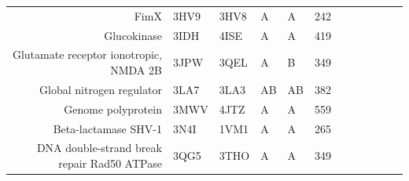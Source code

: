 \begin{table}
\begin{scriptsize}
\begin{tabular}{ r p{0.8cm} p{0.8cm} p{0.8cm} p{0.8cm} r r r r r r r }
\multicolumn{1}{r}{FimX} & \multicolumn{1}{l}{3HV9} & \multicolumn{1}{l}{3HV8} & \multicolumn{1}{l}{A} & \multicolumn{1}{l}{A} & 242   & \cellcolor[rgb]{ .573,  .816,  .314}  & \cellcolor[rgb]{ .573,  .816,  .314}  & \cellcolor[rgb]{ .573,  .816,  .314}  & \cellcolor[rgb]{ .573,  .816,  .314}  & \cellcolor[rgb]{ .573,  .816,  .314}  & \cellcolor[rgb]{ .573,  .816,  .314}  \\
\multicolumn{1}{r}{Glucokinase} & \multicolumn{1}{l}{3IDH} & \multicolumn{1}{l}{4ISE} & \multicolumn{1}{l}{A} & \multicolumn{1}{l}{A} & 419   & \cellcolor[rgb]{ 1,  .494,  .475}  & \cellcolor[rgb]{ 1,  .494,  .475}  & \cellcolor[rgb]{ 1,  .494,  .475}  & \cellcolor[rgb]{ .573,  .816,  .314}  & \cellcolor[rgb]{ .573,  .816,  .314}  & \cellcolor[rgb]{ .573,  .816,  .314}  \\
\multicolumn{1}{r}{Glutamate receptor ionotropic, NMDA 2B} & \multicolumn{1}{l}{3JPW} & \multicolumn{1}{l}{3QEL} & \multicolumn{1}{l}{A} & \multicolumn{1}{l}{B} & 349   & \cellcolor[rgb]{ 1,  .494,  .475}  & \cellcolor[rgb]{ 1,  .494,  .475}  & \cellcolor[rgb]{ 1,  .494,  .475}  & \cellcolor[rgb]{ 1,  .494,  .475}  & \cellcolor[rgb]{ 1,  .494,  .475}  & \cellcolor[rgb]{ 1,  .494,  .475}  \\
\multicolumn{1}{r}{Global nitrogen regulator} & \multicolumn{1}{l}{3LA7} & \multicolumn{1}{l}{3LA3} & \multicolumn{1}{l}{AB} & \multicolumn{1}{l}{AB} & 382   & \cellcolor[rgb]{ 1,  .494,  .475}  & \cellcolor[rgb]{ 1,  .494,  .475}  & \cellcolor[rgb]{ .573,  .816,  .314}  & \cellcolor[rgb]{ 1,  .494,  .475}  & \cellcolor[rgb]{ 1,  .494,  .475}  & \cellcolor[rgb]{ 1,  .494,  .475}  \\
\multicolumn{1}{r}{Genome polyprotein} & \multicolumn{1}{l}{3MWV} & \multicolumn{1}{l}{4JTZ} & \multicolumn{1}{l}{A} & \multicolumn{1}{l}{A} & 559   & \cellcolor[rgb]{ 1,  .494,  .475}  & \cellcolor[rgb]{ 1,  .494,  .475}  & \cellcolor[rgb]{ 1,  .494,  .475}  & \cellcolor[rgb]{ 1,  .494,  .475}  & \cellcolor[rgb]{ 1,  .494,  .475}  & \cellcolor[rgb]{ 1,  .494,  .475}  \\
\multicolumn{1}{r}{Beta-lactamase SHV-1} & \multicolumn{1}{l}{3N4I} & \multicolumn{1}{l}{1VM1} & \multicolumn{1}{l}{A} & \multicolumn{1}{l}{A} & 265   & \cellcolor[rgb]{ .573,  .816,  .314}  & \cellcolor[rgb]{ .573,  .816,  .314}  & \cellcolor[rgb]{ 1,  .494,  .475}  & \cellcolor[rgb]{ .573,  .816,  .314}  & \cellcolor[rgb]{ .573,  .816,  .314}  & \cellcolor[rgb]{ .573,  .816,  .314}  \\
\multicolumn{1}{r}{DNA double-strand break repair Rad50 ATPase} & \multicolumn{1}{l}{3QG5} & \multicolumn{1}{l}{3THO} & \multicolumn{1}{l}{A} & \multicolumn{1}{l}{A} & 349   & \cellcolor[rgb]{ 1,  .494,  .475}  & \cellcolor[rgb]{ 1,  .494,  .475}  & \cellcolor[rgb]{ 1,  .494,  .475}  & \cellcolor[rgb]{ 1,  .494,  .475}  & \cellcolor[rgb]{ 1,  .494,  .475}  & \cellcolor[rgb]{ 1,  .494,  .475}  \\

\end{tabular}
\end{scriptsize}
\end{table}
